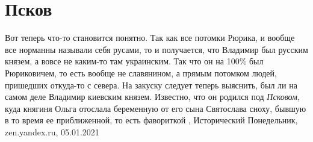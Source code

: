  
 
 
 
 
\chapter{Псков}
\label{sec:slova.pskov}

Вот теперь что-то становится понятно. Так как все потомки Рюрика, и вообще все
норманны называли себя русами, то и получается, что Владимир был русским
князем, а вовсе не каким-то там украинским. Так что он на 100\% был
Рюриковичем, то есть вообще не славянином, а прямым потомком людей, пришедших
откуда-то с севера.  На закуску следует теперь выяснить, был ли на самом деле
Владимир киевским князем. Известно, что он родился под \emph{Псковом}, куда княгиня
Ольга отослала беременную от его сына Святослава сноху, бывшую в то время ее
приближенной, то есть фавориткой
,
Исторический Понедельник, zen.yandex.ru, 05.01.2021 

